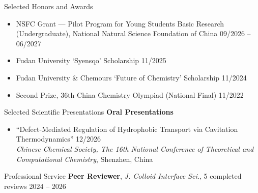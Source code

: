 \documentclass{resume} %
\begin{document}
\begin{rSection}{Selected Honors and Awards}
\begin{itemize}
  \item NSFC Grant --- Pilot Program for Young Students Basic Research (Undergraduate), National Natural Science Foundation of China \hfill 09/2026 -- 06/2027
  \item Fudan University `Syensqo' Scholarship \hfill 11/2025
  \item Fudan University \& Chemours `Future of Chemistry' Scholarship \hfill 11/2024
  \item Second Prize, 36th China Chemistry Olympiad (National Final) \hfill 11/2022
\end{itemize}
\end{rSection}

\begin{rSection}{Selected Scientific Presentations}
\textbf{Oral Presentations}
\begin{itemize}
  \item ``Defect-Mediated Regulation of Hydrophobic Transport via Cavitation Thermodynamics'' \hfill \mbox{12/2026} \\
  \textit{Chinese Chemical Society, The 16th National Conference of Theoretical and Computational Chemistry}, Shenzhen, China
\end{itemize}
\end{rSection}
\begin{rSection}{Professional Service}
\textbf{Peer Reviewer}, \textit{J. Colloid Interface Sci.}, 5 completed reviews \hfill 2024 -- 2026
\end{rSection}
\end{document}
